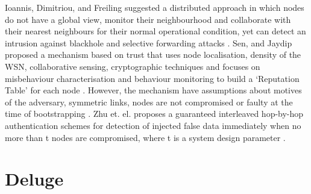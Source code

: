 \documentclass[conference,final]{IEEEtran}
\begin{document}
Ioannis, Dimitriou, and Freiling  suggested a distributed approach in which nodes do not have a global view, monitor their neighbourhood and collaborate with their nearest neighbours for their normal operational condition, yet can detect an intrusion against blackhole and selective forwarding attacks \cite{ioannis2007towards}.
Sen, and Jaydip  proposed a mechanism based on trust that uses node localisation, density of the WSN, collaborative sensing, cryptographic techniques  and focuses on misbehaviour characterisation and behaviour monitoring to build a `Reputation Table' for each node . 
However, the mechanism have assumptions about motives of the adversary, symmetric links, nodes  are not compromised or faulty at the time of bootstrapping \cite{sen2010efficient}. 
Zhu et. el.  proposes a guaranteed interleaved hop-by-hop authentication schemes for detection of injected false data immediately when no more than t nodes are compromised, where t is a system design parameter \cite{Zhu:2007:IHA:1267060.1267062}. 



\section{Deluge} %
\label{sec:del}

\end{document}
